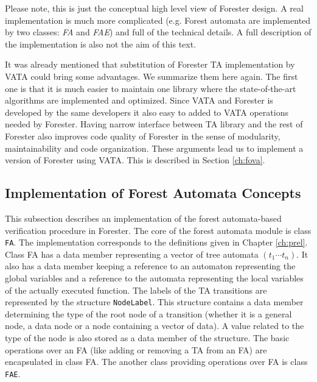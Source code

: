 Please note, this is just the conceptual high level view of Forester design.
A real implementation is much more complicated (e.g. Forest automata are implemented by two classes: \emph{FA} and \emph{FAE})
and full of the technical details.
A full description of the implementation is also not the aim of this text.

It was already mentioned that substitution of Forester TA implementation by
VATA could bring some advantages.
We summarize them here again.
The first one is that it is much easier to maintain one library where
the state-of-the-art algorithms are implemented and optimized.
Since VATA and Forester is developed by the same developers it also easy to added
to VATA operations needed by Forester.
Having narrow interface between TA library and the rest of Forester
also improves code quality of Forester in the sense of modularity, maintainability and code organization.
These arguments lead us to implement a version of Forester using VATA.
This is described in Section \ref{ch:fova}.


\subsection{Implementation of Forest Automata Concepts}
\label{subsec:faimpl}

This subsection describes an implementation of the forest automata-based verification procedure in Forester.
The core of the forest automata module is class {\tt FA}.
The implementation corresponds to the definitions given in Chapter \ref{ch:prel}.
Class FA has a data member representing a vector of tree automata $(t_1 \cdots t_n)$.
It also has a data member keeping a reference to an automaton representing the global variables
and a reference to the automata representing the local variables of the actually executed function. %
The labels of the TA transitions are represented by the structure {\tt NodeLabel}.
This structure contains a data member determining the type of the root node of a transition
(whether it is a general node, a data node or a node containing a vector of data).
A value related to the type of the node is also stored as a data member of the structure.
The basic operations over an FA (like adding or removing a TA from an FA) are encapsulated in class FA.
The another class providing operations over FA is class {\tt FAE}. 

